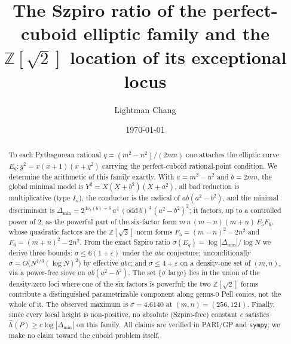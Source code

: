 \documentclass[11pt,reqno]{amsart}
\theoremstyle{plain}
\theoremstyle{definition}
\newcommand{\Z}{\mathbb{Z}}
\newcommand{\hath}{\hat{h}}
\begin{document}
\title[Szpiro ratio of the perfect-cuboid family]{The Szpiro ratio of the perfect-cuboid elliptic family
and the $\Z[\sqrt2]$ location of its exceptional locus}

\author{Lightman Chang}
\address{Independent Researcher}


\date{\today}

\begin{abstract}
To each Pythagorean rational $q=(m^2-n^2)/(2mn)$ one attaches the elliptic curve
$E_q\colon y^2=x(x+1)(x+q^2)$ carrying the perfect-cuboid rational-point condition.
We determine the arithmetic of this family exactly. With $a=m^2-n^2$ and $b=2mn$,
the global minimal model is $Y^2=X(X+b^2)(X+a^2)$, all bad reduction is
multiplicative (type $I_n$), the conductor is the radical of $ab(a^2-b^2)$, and the
minimal discriminant is
$\Delta_{\min}=2^{4v_2(b)-8}\,a^4\,(\mathrm{odd}\,b)^4\,(a^2-b^2)^2$; it factors, up
to a controlled power of $2$, as the powerful part of the six-factor form
$m\,n\,(m-n)(m+n)\,F_5F_6$, whose quadratic factors are the $\Z[\sqrt2]$-norm forms
$F_5=(m-n)^2-2n^2$ and $F_6=(m+n)^2-2n^2$. From the exact Szpiro ratio
$\sigma(E_q)=\log|\Delta_{\min}|/\log N$ we derive three bounds: $\sigma\le
6(1+\varepsilon)$ under the $abc$ conjecture; unconditionally
$\sigma=O\!\bigl(N^{1/3}(\log N)^2\bigr)$ by effective $abc$; and
$\sigma\le4+\varepsilon$ on a density-one set of $(m,n)$, via a power-free sieve on
$ab(a^2-b^2)$. The set $\{\sigma$ large$\}$ lies in the union of the density-zero
loci where one of the six factors is powerful; the two $\Z[\sqrt2]$ forms contribute
a distinguished parametrizable component along genus-$0$ Pell conics, not the whole
of it. The observed maximum is $\sigma=4.6140$ at $(m,n)=(256,121)$. Finally, since
every local height is non-positive, no absolute (Szpiro-free) constant $c$ satisfies
$\hath(P)\ge c\log|\Delta_{\min}|$ on this family. All claims are verified in PARI/GP
and \texttt{sympy}; we make no claim toward the cuboid problem itself.
\end{abstract}

\maketitle
\end{document}
